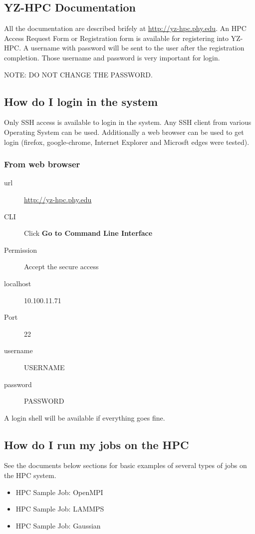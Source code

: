 \documentclass[11pt]{article}
\numberwithin{figure}{section}
\begin{document}
\subsection{YZ-HPC Documentation}
All the documentation are described brifely at \href{http://10.100.11.71} {http://yz-hpc.phy.edu}. An HPC Access Request Form or Registration form is available for registering into YZ-HPC. A username with password will be sent to the user after the registration completion. Those username and password is very important for login.

NOTE: DO NOT CHANGE THE PASSWORD.

\subsection{How do I login in the system}
Only SSH access is available to login in the system. Any SSH client from
various Operating System can be used. Additionally a web browser can be used to
get login (firefox, google-chrome, Internet Explorer and Microsft edges were
tested).

\subsubsection{From web browser}

\begin{description}
    \item[url] \href{http://10.100.11.71}{http://yz-hpc.phy.edu}
    \item[CLI] Click \textbf{Go to Command Line Interface}
    \item[Permission] Accept the secure access
    \item[localhost] 10.100.11.71
    \item[Port] 22
    \item[username] USERNAME
    \item[password] PASSWORD
\end{description}

A login shell will be available if everything goes fine.

\subsection{How do I run my jobs on the HPC}
See the documents below sections for basic examples of several types of jobs on
the HPC system.

\begin{itemize}
    \item HPC Sample Job: OpenMPI
    \item HPC Sample Job: LAMMPS
    \item HPC Sample Job: Gaussian
\end{itemize}
\end{document}
